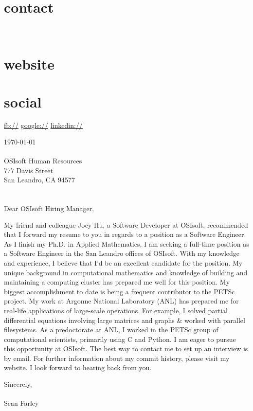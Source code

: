 \documentclass[]{fancy-cv}
\begin{document}

\begin{aside}
  \section{contact}
    \href{mailto:\myemail}{\myemail}
    ~
    \myphone
    ~
    \myaddress
    \mycity
  \section{website}
    \href{\mywebsite}{\mywebsite}
  \section{social}
    \href{http://facebook.com/\myfb}{fb://\myfb}
    \href{http://plug.google.com/\mygp}{google://\mygp}
    \href{http://www.linkedin.com/in/\mylinkedin}{linkedin://\mylinkedin}
\end{aside}

\vspace{.8em}
\large
\today\\
\\
OSIsoft Human Resources\\
777 Davis Street\\
San Leandro, CA 94577\\
\\
\\
Dear OSIsoft Hiring Manager,

My friend and colleague Joey Hu, a Software Developer at OSIsoft, recommended
that I forward my resume to you in regards to a position as a Software
Engineer.  As I finish my Ph.D. in Applied Mathematics, I am seeking a
full-time position as a Software Engineer in the San Leandro offices of
OSIsoft. With my knowledge and experience, I believe that I’d be an excellent
candidate for the position.
%
\newline\newline
%
My unique background in computational mathematics and knowledge of building and
maintaining a computing cluster has prepared me well for this position. My
biggest accomplishment to date is being a frequent contributor to the PETSc
project.
%
\newline\newline
%
My work at Argonne National Laboratory (ANL) has prepared me for real-life
applications of large-scale operations. For example, I solved partial
differential equations involving large matrices and graphs \& worked with
parallel filesystems. As a predoctorate at ANL, I worked in the PETSc group of
computational scientists, primarily using C and Python.
%
\newline\newline
%
I am eager to pursue this opportunity at OSIsoft. The best way to contact me to
set up an interview is by email. For further information about my commit
history, please visit my website. I look forward to hearing back from you.

\vspace{2em}
Sincerely,\\
\\
Sean Farley
\end{document}
